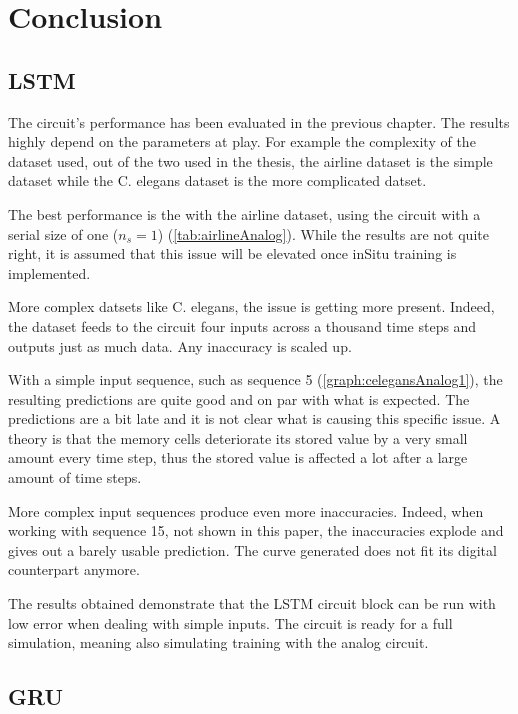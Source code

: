 \section{Conclusion}

\subsection{\ac{LSTM}}

The circuit's performance has been evaluated in the previous chapter. The results highly depend on the parameters at play. For example the complexity of the dataset used, out of the two used in the thesis, the airline dataset is the simple dataset while the \ac{C. elegans} dataset is the more complicated datset.

The best performance is the with the airline dataset, using the circuit with a serial size of one ($n_s=1$) (\cref{tab:airlineAnalog}). While the results are not quite right, it is assumed that this issue will be elevated once inSitu training is implemented.

More complex datsets like \ac{C. elegans}, the issue is getting more present. Indeed, the dataset feeds to the circuit four inputs across a thousand time steps and outputs just as much data. Any inaccuracy is scaled up.

With a simple input sequence, such as sequence 5 (\cref{graph:celegansAnalog1}), the resulting predictions are quite good and on par with what is expected. The predictions are a bit late and it is not clear what is causing this specific issue. A theory is that the memory cells deteriorate its stored value by a very small amount every time step, thus the stored value is affected a lot after a large amount of time steps.

More complex input sequences produce even more inaccuracies. Indeed, when working with sequence 15, not shown in this paper, the inaccuracies explode and gives out a barely usable prediction. The curve generated does not fit its digital counterpart anymore.

The results obtained demonstrate that the \ac{LSTM} circuit block can be run with low error when dealing with simple inputs. The circuit is ready for a full simulation, meaning also simulating training with the analog circuit.

\subsection{\ac{GRU}}

